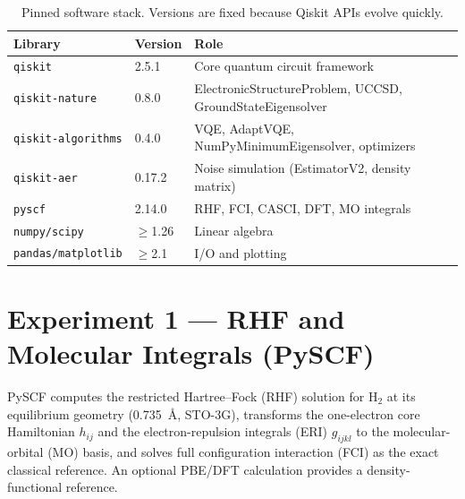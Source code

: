 \documentclass[11pt,a4paper]{article}
\begin{document}
\begin{table}[H]
\centering\small
\begin{tabular}{llp{8cm}}
\toprule
Library & Version & Role \\
\midrule
\texttt{qiskit}           & 2.5.1  & Core quantum circuit framework \\
\texttt{qiskit-nature}    & 0.8.0  & ElectronicStructureProblem, UCCSD, GroundStateEigensolver \\
\texttt{qiskit-algorithms}& 0.4.0  & VQE, AdaptVQE, NumPyMinimumEigensolver, optimizers \\
\texttt{qiskit-aer}       & 0.17.2 & Noise simulation (EstimatorV2, density matrix) \\
\texttt{pyscf}            & 2.14.0 & RHF, FCI, CASCI, DFT, MO integrals \\
\texttt{numpy/scipy}      & $\geq$1.26 & Linear algebra \\
\texttt{pandas/matplotlib}& $\geq$2.1  & I/O and plotting \\
\bottomrule
\end{tabular}
\caption{Pinned software stack. Versions are fixed because Qiskit APIs evolve quickly.}
\end{table}

\section{Experiment 1 --- RHF and Molecular Integrals (PySCF)}

PySCF computes the restricted Hartree--Fock (RHF) solution for H$_2$ at its
equilibrium geometry (0.735~\AA, STO-3G), transforms the one-electron core
Hamiltonian $h_{ij}$ and the electron-repulsion integrals (ERI) $g_{ijkl}$ to
the molecular-orbital (MO) basis, and solves full configuration interaction
(FCI) as the exact classical reference. An optional PBE/DFT calculation
provides a density-functional reference.
\end{document}
